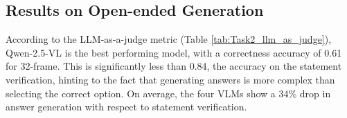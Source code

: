 






\subsection{Results on Open-ended Generation}
\label{ref:Open_gen}

According to the LLM-as-a-judge metric (Table  \ref{tab:Task2_llm_as_judge}), Qwen-2.5-VL is the best performing model, with a correctness accuracy of 0.61 for 32-frame. This is significantly less than 0.84, the accuracy  on the statement verification, hinting to the fact that generating answers is more complex than selecting the correct option. On average, the four VLMs show a  34\% drop  in  answer generation  with respect to statement verification.

